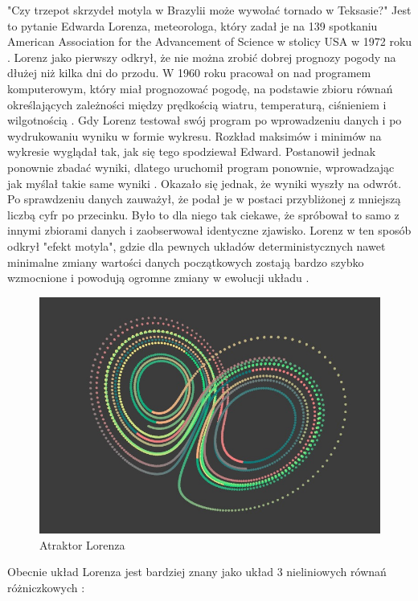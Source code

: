 \documentclass[a4paper,12pt,reqno]{article}
\begin{document}
"Czy trzepot skrzydeł motyla w Brazylii może wywołać tornado w Teksasie?" Jest to pytanie Edwarda Lorenza, meteorologa, który zadał je na 139 spotkaniu American Association for the Advancement of Science w stolicy USA w 1972 roku \cite{lorenz_praca}.
Lorenz jako pierwszy odkrył, że nie można zrobić dobrej prognozy pogody na dłużej niż kilka dni do przodu. W 1960 roku pracował on nad programem komputerowym, który miał prognozować pogodę, na podstawie zbioru równań określających zależności między prędkością wiatru, temperaturą, ciśnieniem i wilgotnością \cite{burze_motyle}. Gdy Lorenz testował swój program po wprowadzeniu danych i po wydrukowaniu wyniku w formie wykresu. Rozkład maksimów i minimów na wykresie wyglądał tak, jak się tego spodziewał Edward. Postanowił jednak ponownie zbadać wyniki, dlatego uruchomił program ponownie, wprowadzając jak myślał takie same wyniki \cite{burze_motyle}. Okazało się jednak, że wyniki wyszły na odwrót. Po sprawdzeniu danych zauważył, że podał je w postaci przybliżonej z mniejszą liczbą cyfr po przecinku. Było to dla niego tak ciekawe, że spróbował to samo z innymi zbiorami danych i zaobserwował identyczne zjawisko. Lorenz w ten sposób odkrył "efekt motyla", gdzie dla pewnych układów deterministycznych nawet minimalne zmiany wartości danych początkowych zostają bardzo szybko wzmocnione i powodują ogromne zmiany w ewolucji układu \cite{burze_motyle}.

\begin{figure}[H]%
\centering
\includegraphics[width=0.7\columnwidth]{graphics/butterfly/Lorenz_Attractor.jpg}
\caption{Atraktor Lorenza 
\label{BPExample}}%
%
\qquad
\end{figure} 

Obecnie układ Lorenza jest bardziej znany jako układ 3 nieliniowych
równań różniczkowych \cite{lorenz_dziwne_atraktory}:
\end{document}
